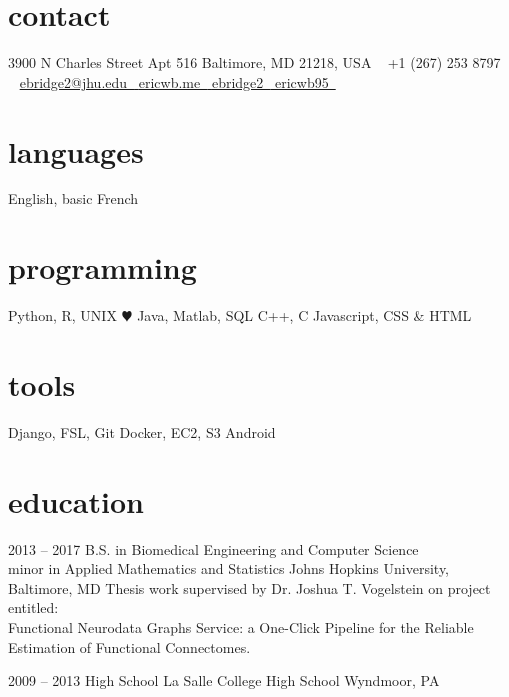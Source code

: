 \documentclass[]{friggeri-cv} %
\begin{document}


\begin{aside} %
\section{contact}
3900 N Charles Street
Apt 516
Baltimore, MD
21218, USA
~
+1 (267) 253 8797~{\color{green} \faMobilePhone}
~
\href{mailto:ebridge2@jhu.edu}{ebridge2@jhu.edu~{\color{red} \faEnvelope}}
\href{http://ericwb.me}{ericwb.me~{\color{brown} \faGlobe}}
\href{http://github.com/ebridge2}{ebridge2~{\color{purple} \faGithub}}
\href{https://www.linkedin.com/in/ericwb95}{ericwb95~{\color{blue} \faLinkedin}}
\section{languages}
English, basic French
\section{programming}
Python, R, UNIX {\color{red} $\varheartsuit$}
Java, Matlab, SQL
C++, C
Javascript, CSS \& HTML
\section{tools}
Django, FSL, Git
Docker, EC2, S3
Android
\end{aside}


\section{education}

\begin{entrylist}


\entry
{2013 -- 2017}
{B.S. {\normalfont in Biomedical Engineering and Computer Science\\ minor in Applied Mathematics and Statistics}}
{Johns Hopkins University, Baltimore, MD}
{Thesis work supervised by Dr. Joshua T. Vogelstein on project entitled: \\Functional Neurodata Graphs Service: a One-Click Pipeline for the Reliable Estimation of Functional Connectomes.}


\entry
{2009 -- 2013}
{High School {\normalfont La Salle College High School}}
{Wyndmoor, PA}

\end{entrylist}
\end{document}
